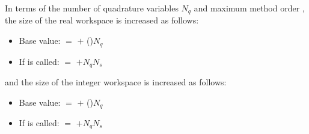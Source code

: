 In terms of the number of quadrature variables $N_q$ and maximum method order ,
the size of the real workspace is increased as follows:
\begin{itemize}
\item Base value:  $=$  $+$ ()$N_q$
\item If  is called:  $=$  $+ N_q N_s$ 
\end{itemize}
and the size of the integer workspace is increased as follows:
\begin{itemize}
\item Base value:  $=$  $+$ ()$N_q$
\item If  is called:  $=$  $+ N_q N_s$ 
\end{itemize}

